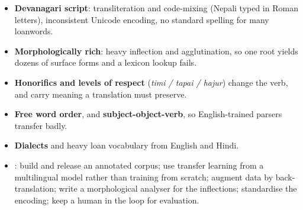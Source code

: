 {\begin{itemize}
        treebank, few parallel corpora. Everything below follows from this.
  \item \textbf{Devanagari script}: transliteration and code-mixing (Nepali typed in
        Roman letters), inconsistent Unicode encoding, no standard spelling for many
        loanwords.
  \item \textbf{Morphologically rich}: heavy inflection and agglutination, so one root
        yields dozens of surface forms and a lexicon lookup fails.
  \item \textbf{Honorifics and levels of respect} (\emph{timi / tapai / hajur}) change the
        verb, and carry meaning a translation must preserve.
  \item \textbf{Free word order}, and \textbf{subject-object-verb}, so English-trained
        parsers transfer badly.
  \item \textbf{Dialects} and heavy loan vocabulary from English and Hindi.
  \item {}:
        build and release an annotated corpus; use transfer learning from a multilingual
        model rather than training from scratch; augment data by back-translation; write
        a morphological analyser for the inflections; standardise the encoding; keep a
        human in the loop for evaluation.
\end{itemize}}

